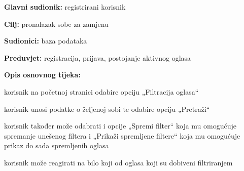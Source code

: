 \noindent {}
\begin{packed_item}
	
	\item \textbf{Glavni sudionik: } registrirani korisnik
	\item  \textbf{Cilj:}  pronalazak sobe za zamjenu
	\item  \textbf{Sudionici:} baza podataka
	\item  \textbf{Preduvjet:} registracija, prijava, postojanje aktivnog oglasa
	\item  \textbf{Opis osnovnog tijeka:}
	
	\item[] \begin{packed_enum}
		
		\item korisnik na početnoj stranici odabire opciju „Filtracija oglasa“
		\item korisnik unosi podatke o željenoj sobi te odabire opciju „Pretraži“
		\item korisnik također može odabrati i opcije „Spremi filter“ koja mu omogućuje spremanje unešenog filtera i „Prikaži spremljene filtere“ koja mu omogućuje prikaz do sada spremljenih oglasa
		\item korisnik može reagirati na bilo koji od oglasa koji su dobiveni filtriranjem
		
	\end{packed_enum}

\end{packed_item}



